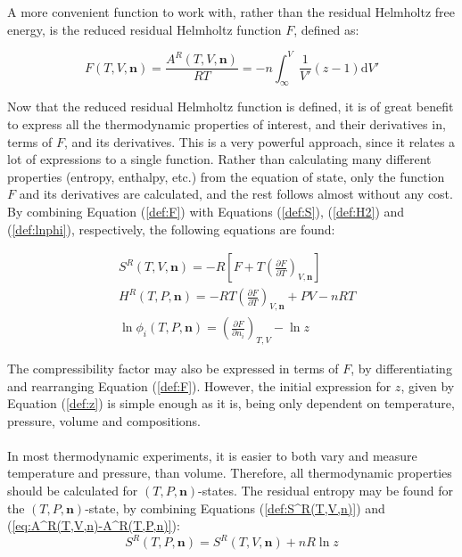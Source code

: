 \documentclass[english]{../thermomemo/thermomemo}
\numberwithin{equation}{section}
\newcommand*{\pder}[2]{\left(\frac{\partial #1}{\partial #2}\right)}
\newcommand*{\reff}[1]{(\ref{#1})}
\begin{document}
A more convenient function to work with, rather than the residual Helmholtz free energy, is the reduced residual Helmholtz function $F$, defined as:

\begin{equation}
\label{def:F}
F(T,V,\textbf{n}) = \frac{A^R(T,V,\textbf{n})}{RT} = - n \int_\infty ^V \frac{1}{V'} (z-1) \mathrm{d}V'
\end{equation}

Now that the reduced residual Helmholtz function is defined, it is of great benefit to express all the thermodynamic properties of interest, and their derivatives in, terms of $F$, and its derivatives. This is a very powerful approach, since it relates a lot of expressions to a single function. Rather than calculating many different properties (entropy, enthalpy, etc.) from the equation of state, only the function $F$ and its derivatives are calculated, and the rest follows almost without any cost. By combining Equation \reff{def:F} with Equations \reff{def:S}, \reff{def:H2} and \reff{def:lnphi}, respectively, the following equations are found:

\begin{align}
\label{def:S^R(T,V,n)}
& S^R(T,V,\textbf{n}) = -R \left[F + T \pder{F}{T}_{V,\textbf{n}} \right] \\
\label{def:H^R(T,P,n)}
& H^R(T,P,\textbf{n}) = - RT \pder{F}{T}_{V,\textbf{n}} + PV - nRT \\
\label{def:lnphi(T,P,n)}
& \ln \phi_i (T,P,\textbf{n}) = \pder{F}{n_i}_{T,V} - \ln z
\end{align}

The compressibility factor may also be expressed in terms of $F$, by differentiating and rearranging Equation \reff{def:F}. However, the initial expression for $z$, given by Equation \reff{def:z} is simple enough as it is, being only dependent on temperature, pressure, volume and compositions.
\\ \\
In most thermodynamic experiments, it is easier to both vary and measure temperature and pressure, than volume. Therefore, all thermodynamic properties should be calculated for $(T,P,\textbf{n})$-states. The residual entropy may be found for the $(T,P,\textbf{n})$-state, by combining Equations \reff{def:S^R(T,V,n)} and \reff{eq:A^R(T,V,n)-A^R(T,P,n)}:
\begin{equation}
\label{def:S^R(T,P,n)}
S^R(T,P,\textbf{n}) = S^R(T,V,\textbf{n}) +nR \ln z
\end{equation}
\end{document}
